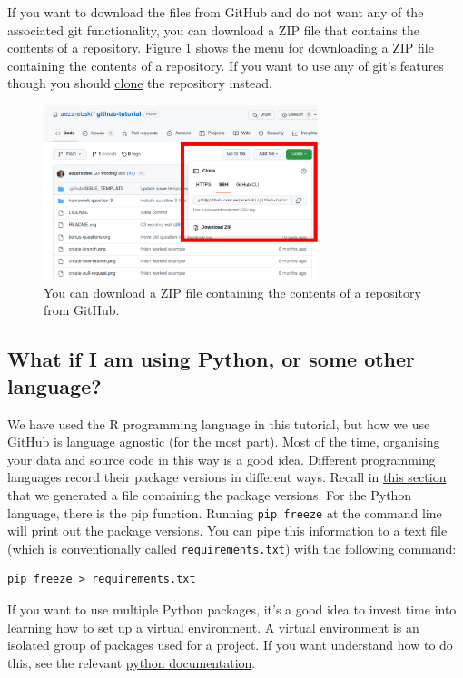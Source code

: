 \documentclass[11pt,onecolumn]{scrartcl}
\begin{document}
If you want to download the files from GitHub and do not want any of the
associated git functionality, you can download a ZIP file that contains the
contents of a repository. Figure \ref{fig:download-zip-file} shows the menu for
downloading a ZIP file containing the contents of a repository. If you want to
use any of git's features though you should \hyperref[sec:org30bf8fb]{clone} the repository instead.

\begin{figure}[htbp]
\centering
\includegraphics[width=8cm]{./download-zip-file.png}
\caption{\label{fig:download-zip-file}You can download a ZIP file containing the contents of a repository from GitHub.}
\end{figure}

\subsection{What if I am using Python, or some other language?}
\label{sec:orgc8bd52f}

We have used the R programming language in this tutorial, but how we use GitHub
is language agnostic (for the most part). Most of the time, organising your data
and source code in this way is a good idea. Different programming languages
record their package versions in different ways. Recall in \hyperref[sec:orgcbfab40]{this section} that we
generated a file containing the package versions. For the Python language, there
is the pip function. Running \texttt{pip freeze} at the command line will print out the
package versions. You can pipe this information to a text file (which is
conventionally called \texttt{requirements.txt}) with the following command:

\lstset{language=sh,label= ,caption= ,captionpos=b,numbers=none}
\begin{lstlisting}
pip freeze > requirements.txt
\end{lstlisting}

If you want to use multiple Python packages, it's a good idea to invest time
into learning how to set up a virtual environment. A virtual environment is an
isolated group of packages used for a project. If you want understand how to do
this, see the relevant \href{https://docs.python.org/3/tutorial/venv.html}{python documentation}.
\end{document}
